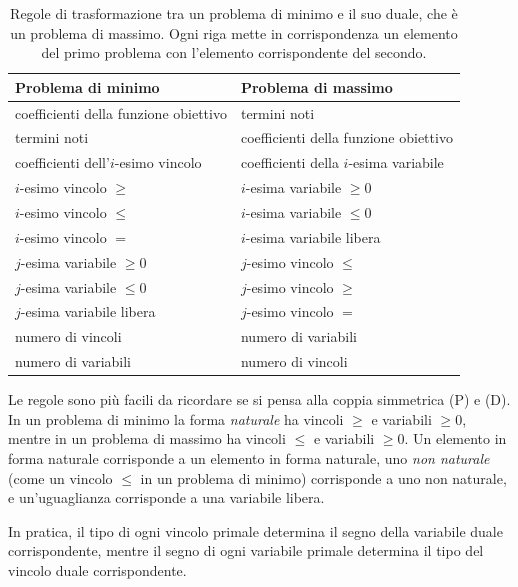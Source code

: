 \begin{table}[htbp]
\centering
\begin{tabular}{ll}
\toprule
\textbf{Problema di minimo} & \textbf{Problema di massimo} \\
\midrule
coefficienti della funzione obiettivo & termini noti \\
termini noti & coefficienti della funzione obiettivo \\
coefficienti dell'$i$-esimo vincolo & coefficienti della $i$-esima variabile \\
\midrule
$i$-esimo vincolo $\ge$ & $i$-esima variabile $\ge 0$ \\
$i$-esimo vincolo $\le$ & $i$-esima variabile $\le 0$ \\
$i$-esimo vincolo $=$ & $i$-esima variabile libera \\
\midrule
$j$-esima variabile $\ge 0$ & $j$-esimo vincolo $\le$ \\
$j$-esima variabile $\le 0$ & $j$-esimo vincolo $\ge$ \\
$j$-esima variabile libera & $j$-esimo vincolo $=$ \\
\midrule
numero di vincoli & numero di variabili \\
numero di variabili & numero di vincoli \\
\bottomrule
\end{tabular}
\caption{Regole di trasformazione tra un problema di minimo e il suo duale, che è un problema di massimo. Ogni riga mette in corrispondenza un elemento del primo problema con l'elemento corrispondente del secondo.}
\label{tab:trasformazioni}
\end{table}

Le regole sono più facili da ricordare se si pensa alla coppia simmetrica (P) e (D). In un problema di minimo la forma \emph{naturale} ha vincoli $\ge$ e variabili $\ge 0$, mentre in un problema di massimo ha vincoli $\le$ e variabili $\ge 0$. Un elemento in forma naturale corrisponde a un elemento in forma naturale, uno \emph{non naturale} (come un vincolo $\le$ in un problema di minimo) corrisponde a uno non naturale, e un'uguaglianza corrisponde a una variabile libera.

In pratica, il tipo di ogni vincolo primale determina il segno della variabile duale corrispondente, mentre il segno di ogni variabile primale determina il tipo del vincolo duale corrispondente.

